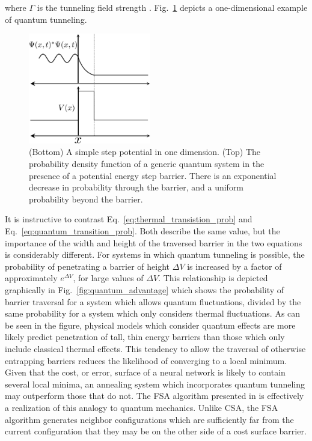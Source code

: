 \documentclass[10pt,journal,cspaper,compsoc]{IEEEtran}
\begin{document}
\noindent where \begin{math} \Gamma \end{math} is the tunneling field strength \cite{mukherjee2015multivariatesearchqa}. Fig.~\ref{fig:quantum_tunneling} depicts a one-dimensional example of quantum tunneling.


\begin{figure}[ht!]
	
	\begin{center}
		\includegraphics[width = 2.1in]{figures/tunneling_ex.eps}
	\end{center}
	\caption{(Bottom) A simple step potential in one dimension. (Top) The probability density function of a generic quantum system in the presence of a potential energy step barrier. There is an exponential decrease in probability through the barrier, and a uniform probability beyond the barrier.}
	
	\label{fig:quantum_tunneling}
\end{figure}


It is instructive to contrast Eq.~\ref{eq:thermal_transistion_prob} and Eq.~\ref{eq:quantum_transition_prob}. Both describe the same value, but the importance of the width and height of the traversed barrier in the two equations is considerably different. For systems in which quantum tunneling is possible, the probability of penetrating a barrier of height $\Delta V$ is increased by a factor of approximately $e^{\Delta V}$, for large values of $\Delta V$. This relationship is depicted graphically in Fig.~\ref{fig:quantum_advantage} which shows the probability of barrier traversal for a system which allows quantum fluctuations, divided by the same probability for a system which only considers thermal fluctuations. As can be seen in the figure, physical models which consider quantum effects are more likely predict penetration of tall, thin energy barriers than those which only include classical thermal effects. This tendency to allow the traversal of otherwise entrapping barriers reduces the likelihood of converging to a local minimum. Given that the cost, or error, surface of a neural network is likely to contain several local minima, an annealing system which incorporates quantum tunneling may outperform those that do not. The FSA algorithm presented in \cite{szu1987fastsimulatedannealing} is effectively a realization of this analogy to quantum mechanics. Unlike CSA, the FSA algorithm generates neighbor configurations which are sufficiently far from the current configuration that they may be on the other side of a cost surface barrier. 
\end{document}
